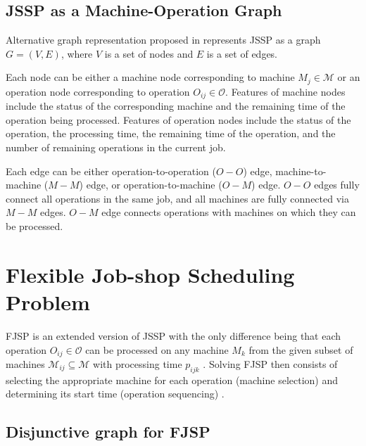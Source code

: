 \subsection{JSSP as a Machine-Operation Graph}

Alternative graph representation proposed in \cite{10226873} represents JSSP as a graph $G = (V, E)$, where $V$ is a set of nodes and $E$ is a set of edges. 
\par
Each node can be either a machine node corresponding to machine $M_j \in \mathcal{M}$ or an operation node corresponding to operation $O_{ij} \in \mathcal{O}$. Features of machine nodes include the status of the corresponding machine and the remaining time of the operation being processed. Features of operation nodes include the status of the operation, the processing time, the remaining time of the operation, and the number of remaining operations in the current job.
\par
Each edge can be either operation-to-operation ($O-O$) edge, machine-to-machine ($M-M$) edge, or operation-to-machine ($O-M$) edge. $O-O$ edges fully connect all operations in the same job, and all machines are fully connected via $M-M$ edges. $O-M$ edge connects operations with machines on which they can be processed.

\section{Flexible Job-shop Scheduling Problem}

FJSP is an extended version of JSSP with the only difference being that each operation $O_{ij} \in \mathcal{O}$ can be processed on any machine $M_k$ from the given subset of machines $\mathcal{M}_{ij} \subseteq \mathcal{M}$ with processing time $p_{ijk}$ \cite{9826438}. Solving FJSP then consists of selecting the appropriate machine for each operation (machine selection) and determining its start time (operation sequencing) \cite{https://doi.org/10.1049/iet-cim.2018.0009}. 

\subsection{Disjunctive graph for FJSP}

